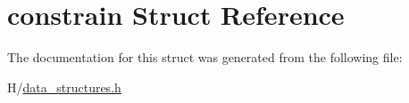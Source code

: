 \hypertarget{structconstrain}{
\section{constrain Struct Reference}
\label{structconstrain}
}


The documentation for this struct was generated from the following file:\begin{DoxyCompactItemize}
\item 
H/\hyperlink{data__structures_8h}{data\_\-structures.h}\end{DoxyCompactItemize}

